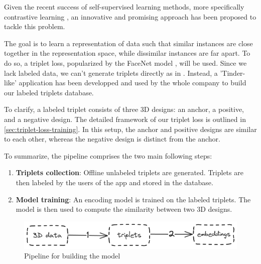 Given the recent success of self-supervised learning methods, more specifically contrastive learning \cite{radfordLearningTransferableVisual2021,yuPointBERTPretraining3D2022,liuOpenShapeScaling3D2023}, an innovative and promising approach has been proposed to tackle this problem.

The goal is to learn a representation of data such that similar instances are close together in the representation space, while dissimilar instances are far apart. To do so, a triplet loss, popularized by the FaceNet model \cite{schroffFaceNetUnifiedEmbedding2015}, will be used. Since we lack labeled data, we can't generate triplets directly as in \cite{schroffFaceNetUnifiedEmbedding2015}. Instead, a 'Tinder-like' application has been developped and used by the whole company to build our labeled triplets database. 

To clarify, a labeled triplet consists of three 3D designs: an anchor, a positive, and a negative design. The detailed framework of our triplet loss is outlined in \autoref{sec:triplet-loss-training}. In this setup, the anchor and positive designs are similar to each other, whereas the negative design is distinct from the anchor.

To summarize, the pipeline comprises the two main following steps:
\begin{enumerate}
    \item \textbf{Triplets collection}: Offline unlabeled triplets are generated. Triplets are then labeled by the users of the app and stored in the database.
    \item \textbf{Model training}: An encoding model is trained on the labeled triplets. The model is then used to compute the similarity between two 3D designs.
\end{enumerate}

\begin{figure}[h]
    \centering
    \includegraphics[width=0.8\columnwidth]{images/steps.png}
    \caption{Pipeline for building the model}   
    \label{fig:steps}
\end{figure}